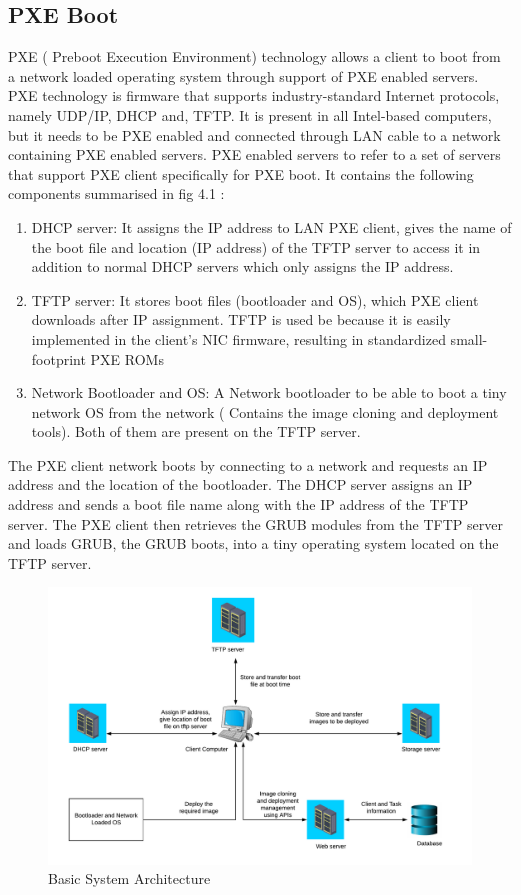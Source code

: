 \documentclass[a4paper,12pt]{article}
\begin{document}
\subsection{ PXE Boot}
PXE ( Preboot Execution Environment) technology allows a client to boot from a network loaded operating system through support of PXE enabled servers. PXE technology is firmware that supports industry-standard Internet protocols, namely UDP/IP, DHCP and, TFTP. It is present in all Intel-based computers, but it needs to be PXE enabled and connected through LAN cable to a network containing PXE enabled servers. 
PXE enabled servers to refer to a set of servers that support PXE client specifically for PXE boot. It contains the following components summarised in fig 4.1 : 
\begin{enumerate}
 \item DHCP server: It assigns the IP address to LAN PXE client, gives the name of the boot file and location (IP address) of the TFTP server to access it in addition to normal DHCP servers which only assigns the IP address.
 \item  TFTP server: It stores boot files (bootloader and OS), which  PXE client downloads after IP assignment. TFTP is used be because it is easily implemented in the client's NIC firmware, resulting in standardized small-footprint PXE ROMs
 \item  Network Bootloader and OS: A Network bootloader to be able to boot a tiny network OS from the network ( Contains the image cloning and deployment tools). Both of them are present on the TFTP server.
 \end{enumerate}
 The PXE client network boots by connecting to a network and requests an IP address and the location of the bootloader. The DHCP server assigns an IP address and sends a boot file name along with the IP address of the TFTP server. The PXE client then retrieves the GRUB modules from the TFTP server and loads GRUB, the GRUB boots, into a tiny operating system located on the TFTP server.
 \begin{figure}[h!]
    \centering
    \includegraphics[width=\linewidth]{basicsysarch.pdf}
    \caption{Basic System Architecture}
    \label{sys_arch}
\end{figure}
\end{document}
